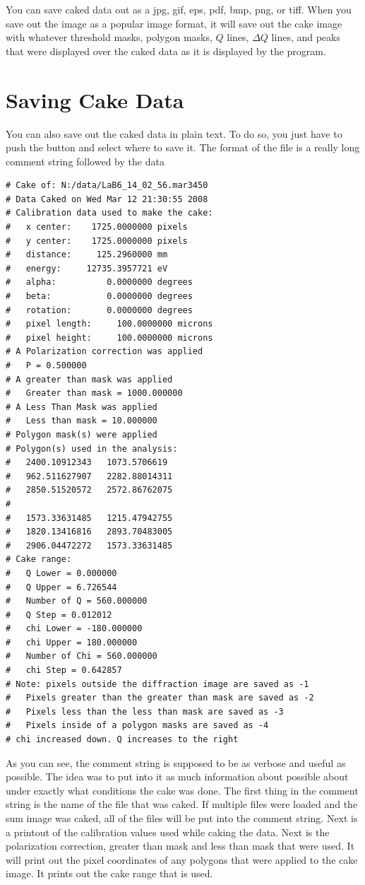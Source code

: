 You can save caked
data out as a jpg, gif, eps, pdf, bmp, png, or tiff.
When you save out the image as a popular image format, it
will save out the cake image with whatever threshold masks,
polygon masks, $Q$ lines, $\Delta Q$ lines, and peaks that
were displayed over the caked data as it is displayed by
the program.

\section{Saving Cake Data}

You can also save out the caked data in plain text. To do so,
you just have to push the  button and
select where to save it. The format of the file is a really
long comment string followed by the data 

\begin{lstlisting}[caption={'The Cake Data Header'}]
# Cake of: N:/data/LaB6_14_02_56.mar3450 
# Data Caked on Wed Mar 12 21:30:55 2008
# Calibration data used to make the cake:
#   x center:    1725.0000000 pixels
#   y center:    1725.0000000 pixels
#   distance:     125.2960000 mm
#   energy:     12735.3957721 eV
#   alpha:          0.0000000 degrees
#   beta:           0.0000000 degrees
#   rotation:       0.0000000 degrees
#   pixel length:     100.0000000 microns
#   pixel height:     100.0000000 microns
# A Polarization correction was applied
#   P = 0.500000
# A greater than mask was applied
#   Greater than mask = 1000.000000
# A Less Than Mask was applied
#   Less than mask = 10.000000
# Polygon mask(s) were applied
# Polygon(s) used in the analysis:
#   2400.10912343	1073.5706619
#   962.511627907	2282.88014311
#   2850.51520572	2572.86762075
#
#   1573.33631485	1215.47942755
#   1820.13416816	2893.70483005
#   2906.04472272	1573.33631485
# Cake range:
#   Q Lower = 0.000000
#   Q Upper = 6.726544
#   Number of Q = 560.000000
#   Q Step = 0.012012
#   chi Lower = -180.000000
#   chi Upper = 180.000000
#   Number of Chi = 560.000000
#   chi Step = 0.642857
# Note: pixels outside the diffraction image are saved as -1
#   Pixels greater than the greater than mask are saved as -2
#   Pixels less than the less than mask are saved as -3
#   Pixels inside of a polygon masks are saved as -4
# chi increased down. Q increases to the right
\end{lstlisting}
As you can see, the comment string is supposed to be as verbose
and useful as possible. The idea was to put into it as much
information about possible about under exactly what conditions
the cake was done. The first thing in the comment string is
the name of the file that was caked. If multiple files were loaded
and the sum image was caked, all of the files will be put into
the comment string. Next is a printout of the calibration values
used while caking the data. Next is the polarization correction,
greater than mask and less than mask that were used. It will print
out the pixel coordinates of any polygons that were applied to
the cake image. It prints out the cake range that is used.

